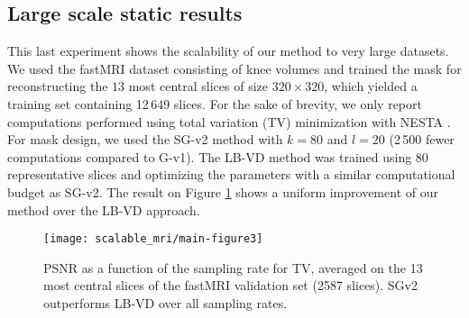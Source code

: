 \subsection{Large scale static results}\label{sec:fastMRI_sLBCS}
This last experiment shows the scalability of our method to very large datasets. We used the fastMRI dataset \citep{zbontarFastMRIOpenDataset2019} consisting of knee volumes  and trained the mask for reconstructing the $13$ most central slices of size $320\times 320$, which yielded a training set containing 12\,649 slices. For the sake of brevity, we only report computations performed using total variation (TV) minimization with NESTA \citep{becker2011nesta}. For mask design, we used the SG-v2 method with $k=80$ and $l=20$ (2\,500 fewer computations compared to G-v1). The LB-VD method was trained using 80 representative slices and optimizing the parameters with a similar computational budget as SG-v2. The result on Figure \ref{fig:psnr_fastmri} shows a uniform improvement of our method over the LB-VD approach.

\begin{figure}[!t]
    \centering
    \begin{minipage}[c]{.55\linewidth}
        \texttt{[image: scalable\_mri/main-figure3]}
    \end{minipage}\hfill
    \begin{minipage}[c]{.4\linewidth}
        \caption{PSNR as a function of the sampling rate for TV, averaged on the 13 most central slices of the fastMRI validation set \citep{zbontarFastMRIOpenDataset2019} (2587 slices). SGv2 outperforms LB-VD over all sampling rates.}\label{fig:psnr_fastmri}
    \end{minipage} 
\end{figure}

